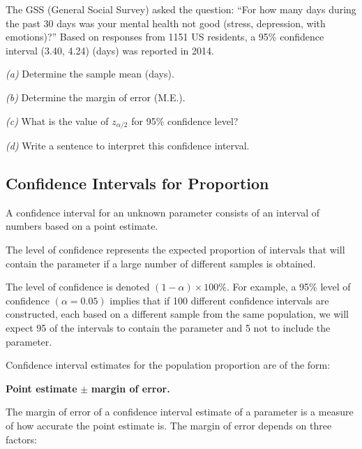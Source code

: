 \documentclass[
]{book}
\begin{document}
The GSS (General Social Survey) asked the question: ``For how many days during the past 30 days was your mental health not good (stress, depression, with emotions)?'' Based on responses from 1151 US residents, a 95\% confidence interval (3.40, 4.24) (days) was reported in 2014.

\emph{(a)} Determine the sample mean (days).

\emph{(b)} Determine the margin of error (M.E.).

\emph{(c)} What is the value of \(z_{\alpha/2}\) for 95\% confidence level?

\emph{(d)} Write a sentence to interpret this confidence interval.

\subsection{Confidence Intervals for Proportion}\label{confidence-intervals-for-proportion}

A confidence interval for an unknown parameter consists of an interval of numbers based on a point estimate.

The level of confidence represents the expected proportion of intervals that will contain the parameter if a large number of different samples is obtained.

The level of confidence is denoted \((1 - \alpha) \times 100\%\). For example, a 95\% level of confidence \((\alpha = 0.05)\) implies that if 100 different confidence intervals are constructed, each based on a different sample from the same population, we will expect 95 of the intervals to contain the parameter and 5 not to include the parameter.

Confidence interval estimates for the population proportion are of the form:

\textbf{Point estimate} \(\pm\) \textbf{margin of error.}

The margin of error of a confidence interval estimate of a parameter is a measure of how accurate the point estimate is. The margin of error depends on three factors:
\end{document}
